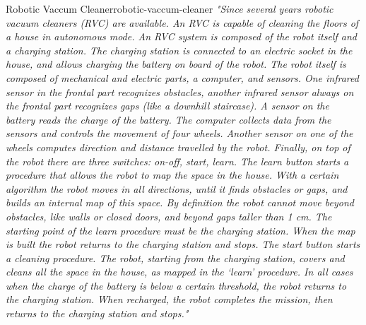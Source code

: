 \documentclass[12pt]{article}
\begin{document}
\hfill

\begin{example}{Robotic Vaccum Cleaner}{robotic-vaccum-cleaner}
  \emph{"Since several years robotic vacuum cleaners (RVC) are available. An RVC is capable of cleaning the floors of a house in autonomous mode. An RVC system is composed of the robot itself and a charging station. The charging station is connected to an electric socket in the house, and allows charging the battery on board of the robot. The robot itself is composed of mechanical and electric parts, a computer, and sensors. One infrared sensor in the frontal part recognizes obstacles, another infrared sensor always on the frontal part recognizes gaps (like a downhill staircase). A sensor on the battery reads the charge of the battery. The computer collects data from the sensors and controls the movement of four wheels. Another sensor on one of the wheels computes direction and distance travelled by the robot. Finally, on top of the robot there are three switches: on-off, start, learn. The learn button starts a procedure that allows the robot to map the space in the house. With a certain algorithm the robot moves in all directions, until it finds obstacles or gaps, and builds an internal map of this space. By definition the robot cannot move beyond obstacles, like walls or closed doors, and beyond gaps taller than 1 cm.  The starting point of the learn procedure must be the charging station. When the map is built the robot returns to the charging station and stops.  The start button starts a cleaning procedure. The robot, starting from the charging station, covers and cleans all the space in the house, as mapped in the ‘learn’ procedure. In all cases when the charge of the battery is below a certain threshold, the robot returns to the charging station. When recharged, the robot completes the mission, then returns to the charging station and stops."}

  \hfill
  

\end{example}
\end{document}
